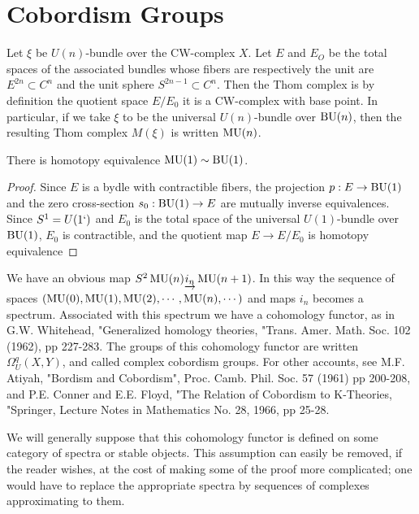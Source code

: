 \documentclass[../main]{subfiles}
\begin{document}
\label{sec:p1c2}

\chapter{Cobordism Groups}
Let $\xi$ be $U(n)$-bundle over the CW-complex $X$. Let $E$ and $E_O$ be the total spaces of the associated bundles whose fibers are respectively the unit are $E^{2n} \subset C^n$ and the unit sphere $S^{2n-1} \subset C^n$. Then the Thom complex is by definition the quotient space $E/E_0$ it is a CW-complex with base point. In particular, if we take $\xi$ to be the universal $U(n)$-bundle over $\mathop{\mathrm{BU}}(n)$, then the resulting Thom complex $M(\xi)$ is written $\mathop{\mathrm{MU}}(n)$.
\begin{example}
\label{ex:p1c02.1}
There is homotopy equivalence $\mathop{\mathrm{MU}}(1) \sim \mathop{\mathrm{BU}}(1)$.
\end{example}
\begin{proof}
Since $E$ is a bydle with contractible fibers, the projection $p: E \rightarrow \mathop{\mathrm{BU}}(1)$ and the zero cross-section $s_0: \mathop{\mathrm{BU}}(1) \rightarrow E$ are mutually inverse equivalences. Since $S^{1} = U(1`)$ and $E_0$ is the total space of the universal  $U(1)$-bundle over $\mathop{\mathrm{BU}}(1)$, $E_0$ is contractible, and the quotient map $E \rightarrow E/E_0$ is homotopy equivalence
\end{proof}
We have an obvious map $S^2 \mathop{\mathrm{MU}}(n) \underrightarrow{i_n} \mathop{\mathrm{MU}}(n+1)$. In this way the sequence of spaces $(\mathop{\mathrm{MU}}(0), \mathop{\mathrm{MU}}(1), \mathop{\mathrm{MU}}(2), \cdots , \mathop{\mathrm{MU}}(n), \cdots)$ and maps $i_n$ becomes a spectrum. Associated with this spectrum we have a cohomology functor, as in G.W. Whitehead, "Generalized homology theories, "Trans. Amer. Math. Soc. 102 (1962), pp 227-283. The groups of this cohomology functor are written $\Omega_U^q (X, Y)$, and called complex cobordism groups. For other accounts, see M.F. Atiyah, "Bordism and Cobordism", Proc. Camb. Phil. Soc. 57 (1961) pp 200-208, and P.E. Conner and E.E. Floyd, "The Relation of Cobordism to K-Theories, "Springer, Lecture Notes in Mathematics No. 28, 1966, pp 25-28.

We will generally suppose that this cohomology functor is defined on some category of spectra or stable objects. This assumption can easily be removed, if the reader wishes, at the cost of making some of the proof more complicated; one would have to replace the appropriate spectra by sequences of complexes approximating to them. 
\end{document}
